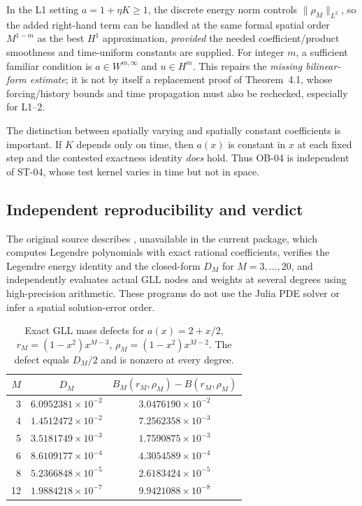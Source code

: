 \documentclass[11pt,a4paper]{amsart}
\theoremstyle{remark}
\theoremstyle{plain}
\theoremstyle{remark}
\numberwithin{equation}{section}
\begin{document}
In the L1 setting $a=1+\eta K\ge1$, the discrete energy norm controls $\|\rho_M\|_{L^2}$, so the added right-hand term can be handled at the same formal spatial order $M^{1-m}$ as the best $H^1$ approximation, \emph{provided} the needed coefficient/product smoothness and time-uniform constants are supplied. For integer $m$, a sufficient familiar condition is $a\in W^{m,\infty}$ and $u\in H^m$. This repairs the \emph{missing bilinear-form estimate}; it is not by itself a replacement proof of Theorem~4.1, whose forcing/history bounds and time propagation must also be rechecked, especially for L1--2.

The distinction between spatially varying and spatially constant coefficients is important. If $K$ depends only on time, then $a(x)$ is constant in $x$ at each fixed step and the contested exactness identity \emph{does} hold. Thus OB-04 is independent of ST-04, whose test kernel varies in time but not in space.

\subsection{Independent reproducibility and verdict}
The original source describes , unavailable in the current package, which computes Legendre polynomials with exact rational coefficients, verifies the Legendre energy identity and the closed-form $D_M$ for $M=3,\ldots,20$, and independently evaluates actual GLL nodes and weights at several degrees using high-precision arithmetic. These programs do not use the Julia PDE solver or infer a spatial solution-error order.
\begin{table}[ht]
\centering
\caption{Exact GLL mass defects for $a(x)=2+x/2$, $r_M=(1-x^2)x^{M-3}$, $\rho_M=(1-x^2)x^{M-2}$. The defect equals $D_M/2$ and is nonzero at every degree.}
\label{tab:ob04-degree}
\small
\begin{tabular}{@{}rcc@{}}\hline
$M$ & $D_M$ & $B_M(r_M,\rho_M)-B(r_M,\rho_M)$ \\\hline
3 & $6.0952381\times10^{-2}$ & $3.0476190\times10^{-2}$\\
4 & $1.4512472\times10^{-2}$ & $7.2562358\times10^{-3}$\\
5 & $3.5181749\times10^{-3}$ & $1.7590875\times10^{-3}$\\
6 & $8.6109177\times10^{-4}$ & $4.3054589\times10^{-4}$\\
8 & $5.2366848\times10^{-5}$ & $2.6183424\times10^{-5}$\\
12& $1.9884218\times10^{-7}$ & $9.9421088\times10^{-8}$\\\hline
\end{tabular}
\end{table}
\end{document}
